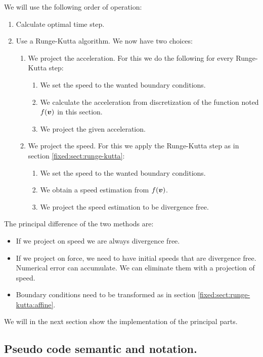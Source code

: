 We will use the following order of operation:
\begin{enumerate}
\item Calculate optimal time step.
 \item Use a Runge-Kutta algorithm. We now have two choices:
 \begin{enumerate}
  \item We project the acceleration.
	For this we do the following for every Runge-Kutta step:
	\begin{enumerate}
	\item We set the speed to the wanted boundary conditions.
	 \item We calculate the acceleration from discretization of the function noted $f({\boldsymbol {v}})$ in this section.
	 \item We project the given acceleration.
	\end{enumerate}
 \item We project the speed.
 For this we apply the Runge-Kutta step as in section \ref{fixed:sect:runge-kutta}:
	\begin{enumerate}
	\item We set the speed to the wanted boundary conditions.
	\item We obtain a speed estimation from $f({\boldsymbol {v}})$.
	\item We project the speed estimation to be divergence free.
	\end{enumerate}
 \end{enumerate}

\end{enumerate}

The principal difference of the two methods are:
\begin{itemize}
 \item If we project on speed we are always divergence free.
 \item If we project on force, we need to have initial speeds that are divergence free. Numerical error can accumulate.
 We can eliminate them with a projection of speed.
 \item Boundary conditions need to be transformed as in section \ref{fixed:sect:runge-kutta:affine}.
\end{itemize}

We will in the next section show the implementation of the principal parts.

\subsection{Pseudo code semantic and notation.}

